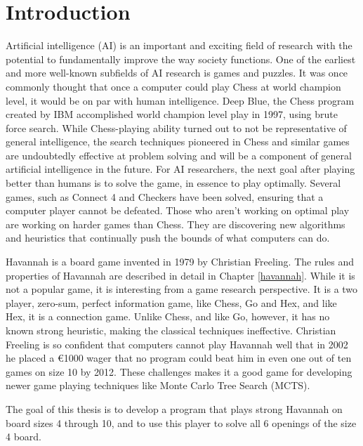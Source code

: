 

\section{Introduction}

Artificial intelligence (AI) is an important and exciting field of research with the potential to fundamentally improve the way society functions. One of the earliest and more well-known subfields of AI research is games and puzzles. It was once commonly thought that once a computer could play Chess at world champion level, it would be on par with human intelligence. Deep Blue, the Chess program created by IBM accomplished world champion level play in 1997, using brute force search. While Chess-playing ability turned out to not be representative of general intelligence, the search techniques pioneered in Chess and similar games are undoubtedly effective at problem solving and will be a component of general artificial intelligence in the future. For AI researchers, the next goal after playing better than humans is to solve the game, in essence to play optimally. Several games, such as Connect 4 and Checkers have been solved, ensuring that a computer player cannot be defeated. Those who aren't working on optimal play are working on harder games than Chess. They are discovering new algorithms and heuristics that  continually push the bounds of what computers can do.

Havannah is a board game invented in 1979 by Christian Freeling. The rules and properties of Havannah are described in detail in Chapter \ref{havannah}. While it is not a popular game, it is interesting from a game research perspective. It is a two player, zero-sum, perfect information game, like Chess, Go and Hex, and like Hex, it is a connection game. Unlike Chess, and like Go, however, it has no known strong heuristic, making the classical techniques ineffective. Christian Freeling is so confident that computers cannot play Havannah well that in 2002 he placed a \euro 1000 wager that no program could beat him in even one out of ten games on size 10 by 2012. These challenges makes it a good game for developing newer game playing techniques like Monte Carlo Tree Search (MCTS).

The goal of this thesis is to develop a program that plays strong Havannah on board sizes 4 through 10, and to use this player to solve all 6 openings of the size 4 board.



